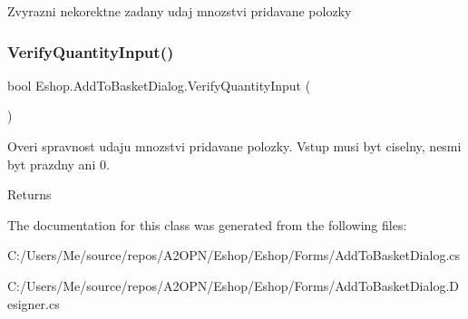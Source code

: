 Zvyrazni nekorektne zadany udaj mnozstvi pridavane polozky 

\mbox{\label{class_eshop_1_1_add_to_basket_dialog_ade7089c2b6b69764b7da1285078dbc37}} 
\subsubsection{\texorpdfstring{VerifyQuantityInput()}{VerifyQuantityInput()}}
{\footnotesize\ttfamily bool Eshop.\+Add\+To\+Basket\+Dialog.\+Verify\+Quantity\+Input (\begin{DoxyParamCaption}{ }\end{DoxyParamCaption})}



Overi spravnost udaju mnozstvi pridavane polozky. Vstup musi byt ciselny, nesmi byt prazdny ani 0. 

\begin{DoxyReturn}{Returns}

\end{DoxyReturn}


The documentation for this class was generated from the following files\+:\begin{DoxyCompactItemize}
\item 
C\+:/\+Users/\+Me/source/repos/\+A2\+O\+P\+N/\+Eshop/\+Eshop/\+Forms/Add\+To\+Basket\+Dialog.\+cs\item 
C\+:/\+Users/\+Me/source/repos/\+A2\+O\+P\+N/\+Eshop/\+Eshop/\+Forms/Add\+To\+Basket\+Dialog.\+Designer.\+cs\end{DoxyCompactItemize}
